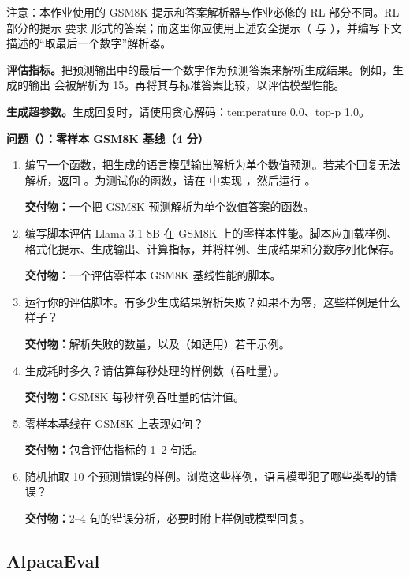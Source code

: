 注意：本作业使用的 GSM8K 提示和答案解析器与作业必修的 RL 部分不同。RL 部分的提示  要求  形式的答案；而这里你应使用上述安全提示（ 与 ），并编写下文描述的“取最后一个数字”解析器。

\textbf{评估指标。}把预测输出中的最后一个数字作为预测答案来解析生成结果。例如，生成的输出  会被解析为 15。再将其与标准答案比较，以评估模型性能。

\textbf{生成超参数。}生成回复时，请使用贪心解码：temperature 0.0、top-p 1.0。

\medskip
\noindent\textbf{问题（）：零样本 GSM8K 基线（4 分）}
\medskip

\begin{enumerate}[label=(\alph*)]
  \item 编写一个函数，把生成的语言模型输出解析为单个数值预测。若某个回复无法解析，返回 。为测试你的函数，请在  中实现 ，然后运行 。

  \textbf{交付物：}一个把 GSM8K 预测解析为单个数值答案的函数。
  \item 编写脚本评估 Llama 3.1 8B 在 GSM8K 上的零样本性能。脚本应加载样例、格式化提示、生成输出、计算指标，并将样例、生成结果和分数序列化保存。

  \textbf{交付物：}一个评估零样本 GSM8K 基线性能的脚本。
  \item 运行你的评估脚本。有多少生成结果解析失败？如果不为零，这些样例是什么样子？

  \textbf{交付物：}解析失败的数量，以及（如适用）若干示例。
  \item 生成耗时多久？请估算每秒处理的样例数（吞吐量）。

  \textbf{交付物：}GSM8K 每秒样例吞吐量的估计值。
  \item 零样本基线在 GSM8K 上表现如何？

  \textbf{交付物：}包含评估指标的 1--2 句话。
  \item 随机抽取 10 个预测错误的样例。浏览这些样例，语言模型犯了哪些类型的错误？

  \textbf{交付物：}2--4 句的错误分析，必要时附上样例或模型回复。
\end{enumerate}

\subsection{AlpacaEval}


